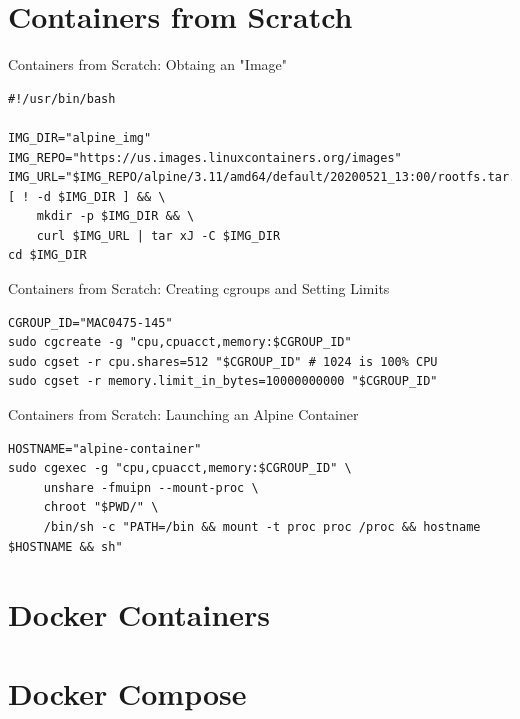 \documentclass[10pt, compress, aspectratio=169, xcolor={table,usenames,dvipsnames}]{beamer}
\begin{document}
\section{Containers from Scratch}
\label{sec:org06c43a6}
\begin{frame}[label={sec:orga2a9d35},fragile]{Containers from Scratch: Obtaing an "Image"}
 \lstset{language=bash,label= ,caption= ,captionpos=b,numbers=none}
\begin{lstlisting}
#!/usr/bin/bash

IMG_DIR="alpine_img"
IMG_REPO="https://us.images.linuxcontainers.org/images"
IMG_URL="$IMG_REPO/alpine/3.11/amd64/default/20200521_13:00/rootfs.tar.xz"
[ ! -d $IMG_DIR ] && \
    mkdir -p $IMG_DIR && \
    curl $IMG_URL | tar xJ -C $IMG_DIR
cd $IMG_DIR
\end{lstlisting}
\end{frame}
\begin{frame}[label={sec:orgc6f87c5},fragile]{Containers from Scratch: Creating cgroups and Setting Limits}
 \lstset{language=bash,label= ,caption= ,captionpos=b,numbers=none}
\begin{lstlisting}
CGROUP_ID="MAC0475-145"
sudo cgcreate -g "cpu,cpuacct,memory:$CGROUP_ID"
sudo cgset -r cpu.shares=512 "$CGROUP_ID" # 1024 is 100% CPU
sudo cgset -r memory.limit_in_bytes=10000000000 "$CGROUP_ID"
\end{lstlisting}
\end{frame}

\begin{frame}[label={sec:org696b7cb},fragile]{Containers from Scratch: Launching an Alpine Container}
 \lstset{language=bash,label= ,caption= ,captionpos=b,numbers=none}
\begin{lstlisting}
HOSTNAME="alpine-container"
sudo cgexec -g "cpu,cpuacct,memory:$CGROUP_ID" \
     unshare -fmuipn --mount-proc \
     chroot "$PWD/" \
     /bin/sh -c "PATH=/bin && mount -t proc proc /proc && hostname $HOSTNAME && sh"
\end{lstlisting}
\end{frame}


\section{Docker Containers}
\label{sec:orgd92d2f1}
\section{Docker Compose}
\label{sec:org3bb7bdc}
\end{document}
